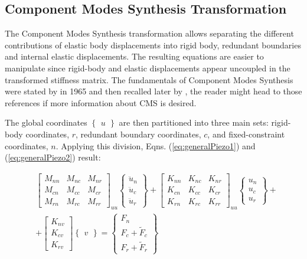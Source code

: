\documentclass{ifacconf}
\begin{document}
\subsection{Component Modes Synthesis Transformation}
\label{subsec:CMS}

The Component Modes Synthesis transformation allows separating the different contributions of elastic body displacements into rigid body, redundant boundaries and internal elastic displacements. The resulting equations are easier to manipulate since rigid-body and elastic displacements appear uncoupled in the transformed stiffness matrix. The fundamentals of Component Modes Synthesis were stated by \cite{Hurty1965_CM} in 1965 and then recalled later by \cite{Craig2000_CB}, the reader might head to those references if more information about CMS is desired.

The global coordinates $\begin{Bmatrix} u \end{Bmatrix}$ are then partitioned into three main sets: rigid-body coordinates, $r$, redundant boundary coordinates, $c$, and fixed-constraint coordinates, $n$. Applying this division, Eqns. (\ref{eq:generalPiezo1}) and (\ref{eq:generalPiezo2}) result:

\small
\begin{equation}
\begin{split}
\label{eq:generalPiezo1divided}
& \begin{bmatrix} M_{nn} & M_{nc} & M_{nr} \\ M_{cn} & M_{cc} & M_{cr} \\ M_{rn} & M_{rc} & M_{rr}\end{bmatrix}_{uu} \begin{Bmatrix} \ddot{u}_n \\ \ddot{u}_c \\ \ddot{u}_r  \end{Bmatrix} + \begin{bmatrix} K_{nn} & K_{nc} & K_{nr} \\ K_{cn} & K_{cc} & K_{cr} \\ K_{rn} & K_{rc} & K_{rr}\end{bmatrix}_{uu} \begin{Bmatrix} u_n \\ u_c \\ u_r  \end{Bmatrix} + \\
& +\begin{bmatrix} K_{nv} \\ K_{cv} \\ K_{rv} \end{bmatrix} \begin{Bmatrix} v \end{Bmatrix} = \begin{Bmatrix} F_n \\ F_c + \tilde{F}_c \\ F_r + \tilde{F}_r \end{Bmatrix}
\end{split}
\end{equation}
\end{document}
